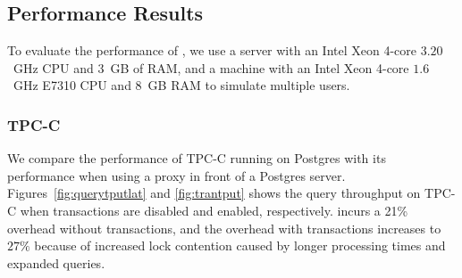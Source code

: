 \subsection{Performance Results}

To evaluate the performance of \name, we use a server with an Intel
Xeon 4-core $3.20$~GHz CPU and 3~GB of RAM, and a machine with
an Intel Xeon 4-core $1.6$~GHz E7310 CPU and $8$~GB RAM to
simulate multiple users.

\subsubsection{TPC-C}



We compare the performance of TPC-C running on Postgres with its
performance when using a \name proxy in front of a Postgres server.
Figures~\ref{fig:querytputlat} and \ref{fig:trantput} shows the
query throughput on TPC-C when transactions are disabled and enabled,
respectively.  \name incurs a 21\% overhead without transactions, and
the overhead with transactions increases to $27\%$ because of
increased lock contention caused by longer processing times and
expanded queries.



